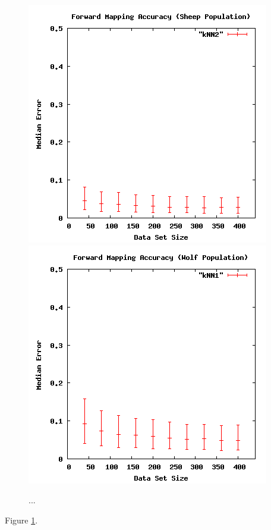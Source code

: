 \begin{figure}[ht]
\centering
\includegraphics[scale=.4]{images/results_wolfsheep/fm-sheep-pop.png}
\includegraphics[scale=.4]{images/results_wolfsheep/fm-wolf-pop.png}
\caption{...}
\label{fig:wolfsheeppop}
\end{figure}

Figure \ref{fig:wolfsheeppop}.

